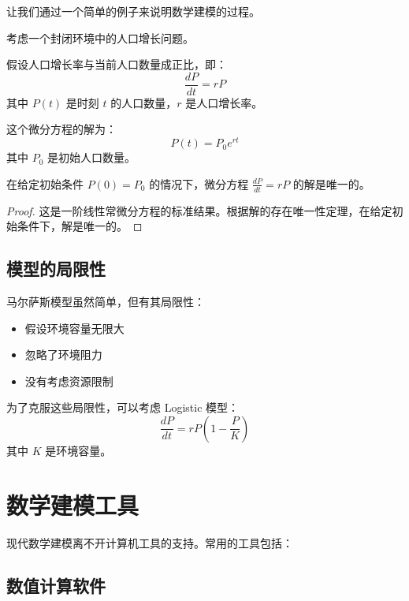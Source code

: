 让我们通过一个简单的例子来说明数学建模的过程。

\begin{example}[人口增长模型]\label{ex:population-growth}
考虑一个封闭环境中的人口增长问题。
\end{example}

\begin{examplebox}[title=马尔萨斯人口模型]
假设人口增长率与当前人口数量成正比，即：
\[
\frac{dP}{dt} = rP
\]
其中 $P(t)$ 是时刻 $t$ 的人口数量，$r$ 是人口增长率。

这个微分方程的解为：
\[
P(t) = P_0 e^{rt}
\]
其中 $P_0$ 是初始人口数量。
\end{examplebox}

\begin{theorem}[马尔萨斯模型解的唯一性]\label{thm:malthus-uniqueness}
在给定初始条件 $P(0) = P_0$ 的情况下，微分方程 $\frac{dP}{dt} = rP$ 的解是唯一的。
\end{theorem}

\begin{proof}
这是一阶线性常微分方程的标准结果。根据解的存在唯一性定理，在给定初始条件下，解是唯一的。
\end{proof}

\subsection{模型的局限性}

马尔萨斯模型虽然简单，但有其局限性：

\begin{itemize}
    \item 假设环境容量无限大
    \item 忽略了环境阻力
    \item 没有考虑资源限制
\end{itemize}

\begin{successbox}[title=改进模型]
为了克服这些局限性，可以考虑 Logistic 模型：
\[
\frac{dP}{dt} = rP\left(1 - \frac{P}{K}\right)
\]
其中 $K$ 是环境容量。
\end{successbox}

\section{数学建模工具}\label{sec:modeling-tools}

现代数学建模离不开计算机工具的支持。常用的工具包括：

\subsection{数值计算软件}

